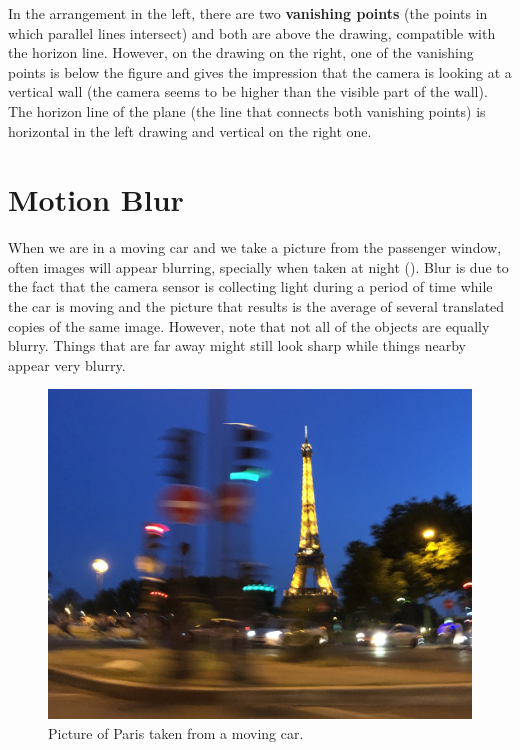 In the arrangement in the left, there are two {\bf vanishing points} (the points in which parallel lines intersect) and both are above the drawing, compatible with the horizon line. However, on the drawing on the right, one of the vanishing points is below the figure and gives the impression that the camera is looking at a vertical wall (the camera seems to be higher than the visible part of the wall). The horizon line of the plane (the line that connects both vanishing points) is horizontal in the left drawing and vertical on the right one.





\section{Motion Blur}

When we are in a moving car and we take a picture from the passenger window, often images will appear blurring, specially when taken at night (\fig{\ref{fig:Paris_from_moving_car}}). Blur is due to the fact that the camera sensor is collecting light during a period of time while the car is moving and the picture that results is the average of several translated copies of the same image. However, note that not all of the objects are equally blurry. Things that are far away might still look sharp while things nearby appear very blurry.

\begin{figure}[h!]
    \centerline{
        \includegraphics[width=1\linewidth]{figures/visionscience/motion_blur.jpg}} %
    \caption{Picture of Paris taken from a moving car.}
    \label{fig:Paris_from_moving_car}
\end{figure}

